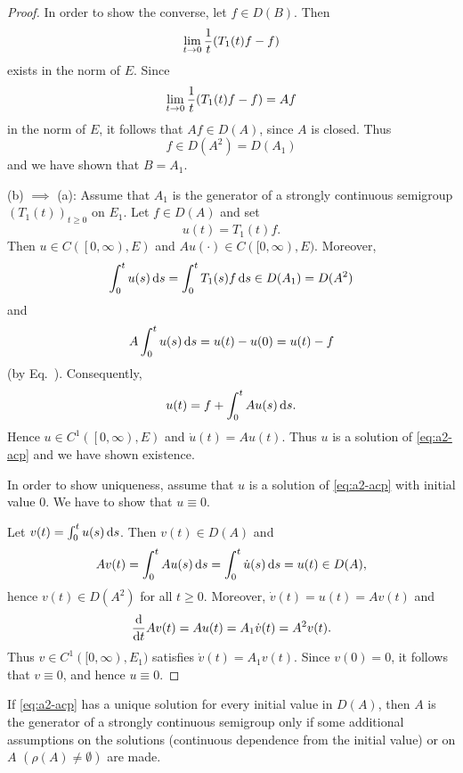 \begin{proof}
In order to show the converse, let $f \in D(B)$.
Then 
\[ 
\lim_{t \to 0} \frac{1}{t} \mleft( T_{1}(t)f - f \mright)
\]
exists in the norm of\/ $E$.
Since  
\[ 
\lim_{t \to 0} \frac{1}{t} \mleft( T_{1}(t)f - f \mright)
= Af 
\]
in the norm of $E$, it follows that $Af \in D(A)$, since $A$ is closed.
Thus 
\[
f \in D(A^{2}) = D(A_{1})
\]
and we have shown that $B = A_{1}$.

(b)  $\implies$ (a):  
Assume that $A_{1}$ is the generator of a strongly continuous semigroup $(T_{1}(t))_{t \geq 0}$ on $E_{1}$.
Let $f \in D(A)$ and set 
\[
u(t) = T_{1}(t)f.
\]
Then $u \in C(\left[0,\infty\right),E)$ and $Au(\cdot) \in C([0,\infty),E)$.
Moreover, 
\[
\int_{0}^{t} u(s) \mathop{}\!\mathrm{d}{s} = \int_{0}^{t} T_{1}(s) f   \mathop{}\!\mathrm{d}{s} \in D(A_{1}) = D(A^{2})
\]
and 
\[
A\int_{0}^{t} u(s) \mathop{}\!\mathrm{d}{s} = u(t) - u(0) = u(t) - f
\]
(by Eq.~).
Consequently, 
\[
    u(t) = f + \int_{0}^{t} Au(s) \mathop{}\!\mathrm{d}{s} .
\]
Hence $u \in C^{1}(\left[0,\infty  \right),E)$ and $\dot{u}(t) = Au(t)$.
Thus $u$ is a solution of \eqref{eq:a2-acp} and we have shown existence.

In order to show uniqueness, assume that $u$ is a solution of \eqref{eq:a2-acp} with initial value $0$.
We have to show that $u \equiv 0$.

Let $v(t) = \int_{0}^{t} u(s)\mathop{}\!\mathrm{d}{s}$.
Then $v(t) \in D(A)$ and
\[
    Av(t) = \int_{0}^{t} Au(s)\mathop{}\!\mathrm{d}{s} 
          = \int_{0}^{t} \dot{u}(s)\mathop{}\!\mathrm{d}{s} 
          = u(t) \in D(A),
\]
hence $v(t) \in D(A^{2})$ for all $t \geq 0$.
Moreover, $\dot{v}(t) = u(t) = Av(t)$ and
\[
    \frac{\mathop{}\!\mathrm{d}{}}{\mathop{}\!\mathrm{d}{t}}Av(t) = Au(t) = A_{1}\dot{v}(t) = A^{2}v(t).
\]
Thus $v \in C^{1}([0,\infty), E_{1})$ satisfies $\dot{v}(t) = A_{1}v(t)$.
Since $v(0) = 0$, it follows that $v \equiv 0$, and hence $u \equiv 0$.
\end{proof}
If \eqref{eq:a2-acp} has a unique solution for every initial value in $D(A)$, then $A$ is the generator of a strongly continuous semigroup only if some additional assumptions on the solutions (continuous dependence from the initial value) or on $A$ $(\rho(A) \neq \emptyset)$ are made.
